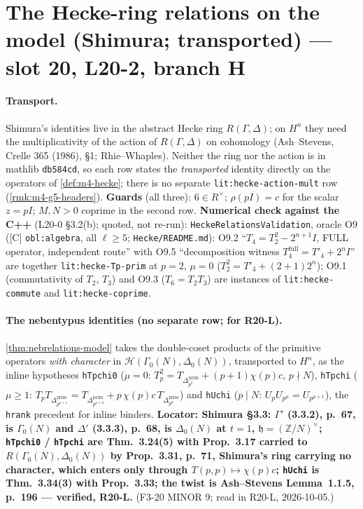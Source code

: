 \section{The Hecke-ring relations on the model (Shimura; transported) --- slot 20, L20-2, branch H}

\providecommand{\VERIFYloc}[1]{\textbf{Locator: #1.}}

\paragraph{Transport.} Shimura's identities live in the abstract Hecke ring $R(\Gamma,\Delta)$; on $H^n$ they need the
multiplicativity of the action of $R(\Gamma,\Delta)$ on cohomology (Ash--Stevens, Crelle 365 (1986), \S1; Rhie--Whaples).
Neither the ring nor the action is in mathlib \texttt{db584cd}, so each row states the \emph{transported} identity directly
on the operators of \ref{def:m4-hecke}; there is no separate \texttt{lit:hecke-action-mult} row (\ref{rmk:m4-g5-headers}).
\textbf{Guards} (all three): $6\in R^\times$; $\rho(pI)=c$ for the scalar $z=pI$; $M,N>0$ coprime in the second row.
\textbf{Numerical check against the C++} (L20-0 \S3.2(b); quoted, not re-run): \texttt{HeckeRelationsValidation}, oracle O9
([C] \texttt{obl:algebra}, all $\ell\ge5$; \texttt{Hecke/README.md}): O9.2 ``$T_4=T_2^2-2^{n+1}I$, FULL operator, independent
route'' with O9.5 ``decomposition witness $T_4^{\mathrm{full}}=T'_4+2^nI$'' are together \texttt{lit:hecke-Tp-prim} at $p=2$,
$\mu=0$ ($T_2^2=T'_4+(2+1)2^n$); O9.1 (commutativity of $T_2$, $T_3$) and O9.3 ($T_6=T_2T_3$) are instances of
\texttt{lit:hecke-commute} and \texttt{lit:hecke-coprime}.

\paragraph{The nebentypus identities (no separate row; for R20-L).} \ref{thm:nebrelations-model} takes the double-coset
products of the primitive operators \emph{with character} in $\mathcal H(\Gamma_0(N),\Delta_0(N))$, transported to $H^n$, as the
inline hypotheses \texttt{hTpchi0} ($\mu=0$: $T_p^2=T_{\Delta^{\mathrm{prim}}_{p^2}}+(p+1)\chi(p)c$, $p\nmid N$), \texttt{hTpchi}
($\mu\ge1$: $T_pT_{\Delta^{\mathrm{prim}}_{p^{\mu+1}}}=T_{\Delta^{\mathrm{prim}}_{p^{\mu+2}}}+p\,\chi(p)c\,T_{\Delta^{\mathrm{prim}}_{p^\mu}}$)
and \texttt{hUchi} ($p\mid N$: $U_pU_{p^\mu}=U_{p^{\mu+1}}$), the \texttt{hrank} precedent for inline binders.
\VERIFYloc{Shimura \S3.3: $\Gamma'$ (3.3.2), p.~67, is $\Gamma_0(N)$ and $\Delta'$ (3.3.3), p.~68, is $\Delta_0(N)$ at $t=1$,
$\mathfrak h=(\mathbb Z/N)^\times$; \texttt{hTpchi0} / \texttt{hTpchi} are Thm.~3.24(5) with Prop.~3.17 carried to
$R(\Gamma_0(N),\Delta_0(N))$ by Prop.~3.31, p.~71, Shimura's ring carrying no character, which enters only through
$T(p,p)\mapsto\chi(p)c$; \texttt{hUchi} is Thm.~3.34(3) with Prop.~3.33; the twist is Ash--Stevens Lemma~1.1.5, p.~196 ---
verified, R20-L}
(F3-20 MINOR 9; read in R20-L, 2026-10-05.)

